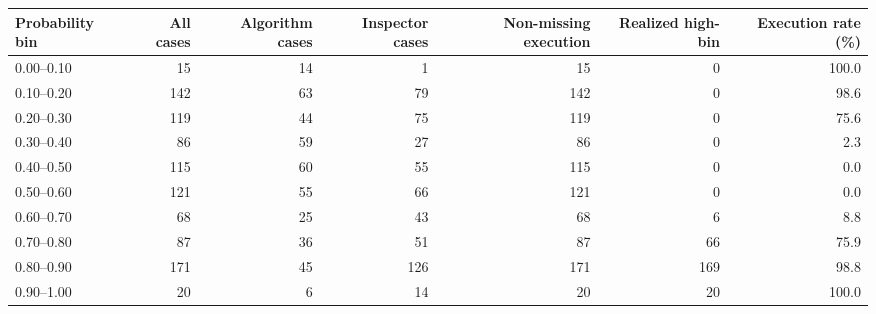 \begin{tabular}[t]{lrrrrrr}
\toprule
Probability bin & All cases & Algorithm cases & Inspector cases & Non-missing execution & Realized high-bin & Execution rate (\%)\\
\midrule
0.00--0.10 & 15 & 14 & 1 & 15 & 0 & 100.0\\
0.10--0.20 & 142 & 63 & 79 & 142 & 0 & 98.6\\
0.20--0.30 & 119 & 44 & 75 & 119 & 0 & 75.6\\
0.30--0.40 & 86 & 59 & 27 & 86 & 0 & 2.3\\
0.40--0.50 & 115 & 60 & 55 & 115 & 0 & 0.0\\
0.50--0.60 & 121 & 55 & 66 & 121 & 0 & 0.0\\
0.60--0.70 & 68 & 25 & 43 & 68 & 6 & 8.8\\
0.70--0.80 & 87 & 36 & 51 & 87 & 66 & 75.9\\
0.80--0.90 & 171 & 45 & 126 & 171 & 169 & 98.8\\
0.90--1.00 & 20 & 6 & 14 & 20 & 20 & 100.0\\
\bottomrule
\end{tabular}
